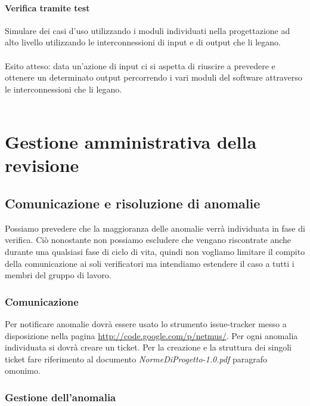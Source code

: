 \subsubsection{Verifica tramite test}

Simulare dei casi d'uso utilizzando i moduli
individuati nella progettazione ad alto livello utilizzando le
interconnessioni di input e di output che li legano.
\\\\
Esito atteso: data un'azione di input ci si aspetta di riuscire a prevedere e
ottenere un determinato output percorrendo i vari moduli del software attraverso le interconnessioni che
li legano. 
\\\\




\chapter{Gestione amministrativa della \\revisione}
\thispagestyle{fancy} %

\section{Comunicazione e risoluzione di anomalie}

Possiamo prevedere che la maggioranza delle anomalie verr\`a individuata in fase
di verifica. Ci\`o nonostante non possiamo escludere che vengano riscontrate
anche durante una qualsiasi fase di ciclo di vita, quindi non vogliamo limitare
il compito della comunicazione ai soli verificatori ma intendiamo estendere il
caso a tutti i membri del gruppo di lavoro.

\subsection{Comunicazione}

Per notificare anomalie dovr\`a essere usato lo strumento issue-tracker messo a
disposizione nella pagina \url{http://code.google.com/p/netmus/}. Per ogni
anomalia individuata si dovr\`a creare un ticket. Per la creazione e la struttura dei
singoli ticket fare riferimento al documento \emph{NormeDiProgetto-1.0.pdf} paragrafo omonimo.


\subsection{Gestione dell'anomalia}


